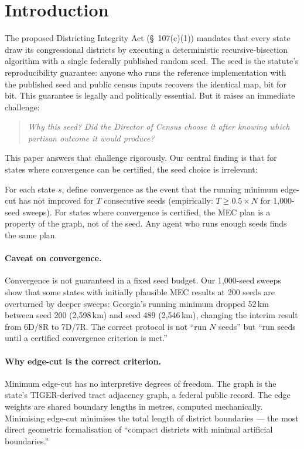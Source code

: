 \section{Introduction}
\label{sec:intro}

The proposed Districting Integrity Act (\S~107(c)(1)) mandates that every
state draw its congressional districts by executing a deterministic
recursive-bisection algorithm with a single federally published random seed.
The seed is the statute's reproducibility guarantee: anyone who runs the
reference implementation with the published seed and public census inputs
recovers the identical map, bit for bit. This guarantee is legally and
politically essential. But it raises an immediate challenge:

\begin{quote}
\emph{Why this seed? Did the Director of Census choose it after knowing which
partisan outcome it would produce?}
\end{quote}

This paper answers that challenge rigorously. Our central finding is that
for states where convergence can be certified, the seed choice is irrelevant:

\begin{theorem}[informal]
For each state $s$, define convergence as the event that the running minimum
edge-cut has not improved for $T$ consecutive seeds (empirically: $T \geq
0.5 \times N$ for 1{,}000-seed sweeps). For states where convergence is
certified, the MEC plan is a property of the graph, not of the seed.
Any agent who runs enough seeds finds the same plan.
\end{theorem}

\paragraph{Caveat on convergence.}
Convergence is not guaranteed in a fixed seed budget. Our 1{,}000-seed sweeps
show that some states with initially plausible MEC results at 200 seeds are
overturned by deeper sweeps: Georgia's running minimum dropped 52\,km between
seed 200 (2{,}598\,km) and seed 489 (2{,}546\,km), changing the interim result
from 6D/8R to 7D/7R. The correct protocol is not ``run $N$ seeds'' but
``run seeds until a certified convergence criterion is met.''

\paragraph{Why edge-cut is the correct criterion.}
Minimum edge-cut has no interpretive degrees of freedom. The graph is the
state's TIGER-derived tract adjacency graph, a federal public record. The
edge weights are shared boundary lengths in metres, computed mechanically.
Minimising edge-cut minimises the total length of district boundaries ---
the most direct geometric formalisation of ``compact districts with minimal
artificial boundaries.''

